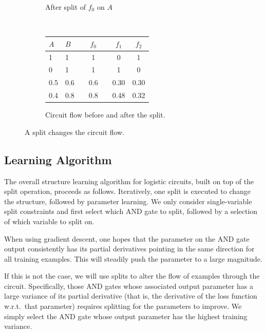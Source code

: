\documentclass[letterpaper]{article} %
\begin{document}
\begin{figure}[t]
\begin{subfigure}[t]{0.22\textwidth}
{
	}
    	\caption{After split of $f_0$ on $A$} \label{fig: split:after}
	\end{subfigure}
	\\[5pt]
    \begin{subfigure}[t]{0.48\textwidth}
    \centering
    \begin{sc}
    {\fontsize{9}{9}\selectfont
            \begin{tabular}{ @{} ll  c  c c cc@{} }
             \toprule
              $A$ & $B$  & & $f_0$ & & $f_1$ & $f_2$ \\
             \midrule \midrule
             1 & 1 & &1 & & 0 & 1 \\
             0 & 1 & &1 & & 1 & 0 \\
             \midrule
    	0.5 & 0.6 & & 0.6 & & 0.30 & 0.30 \\
    	0.4 & 0.8 & & 0.8 & & 0.48 & 0.32 \\
              \bottomrule
           	\end{tabular}
    	}
              \end{sc}
    		\caption{Circuit flow before and after the split.}\label{table: flow change}
	\end{subfigure}
	\caption{A split changes the circuit flow.}\label{fig: split with flow change}
\end{figure}





\subsection{Learning Algorithm}
The overall structure learning algorithm for logistic circuits, built on top of the split operation, proceeds as follows. Iteratively, one split is executed to change the structure, followed by parameter learning.
We only consider single-variable split constraints and first select which AND gate to split, followed by a selection of which variable to split on.

When using gradient descent, one hopes that the parameter on the AND gate output consistently has its partial derivatives pointing in the same direction for all training examples. This will steadily push the parameter to a large magnitude.

If this is not the case, we will use splits to alter the flow of examples through the circuit.
Specifically, those AND gates whose associated output parameter has a large variance of its partial derivative (that is, the derivative of the loss function w.r.t.~that parameter) requires splitting for the parameters to improve.  We simply select the AND gate whose output parameter has the highest training variance.
\end{document}

